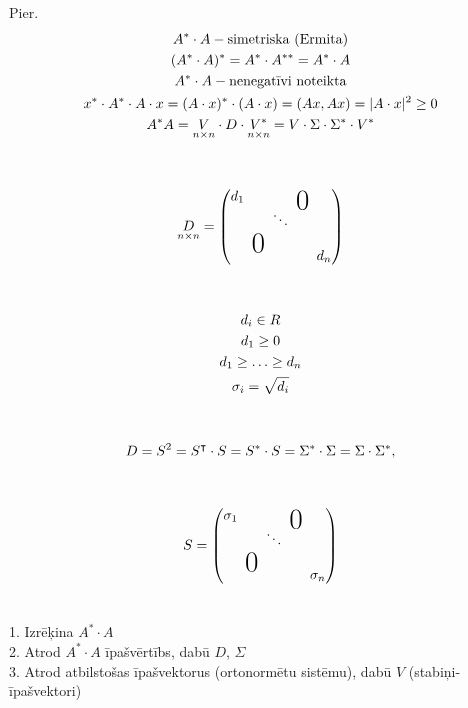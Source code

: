 \documentclass[12pt]{article}
\begin{document}
Pier. 
\begin{gather*}
A^{*} \cdot A  - \text{simetriska (Ermita)} \\
(A^{*} \cdot A)^{*} = A^{*} \cdot A^{**} = A^{*} \cdot A \\
 A^{*} \cdot A - \text{nenegatīvi noteikta} \\
x^{*} \cdot A^{*} \cdot A \cdot x = (A \cdot x)^{*} \cdot (A \cdot x) = (Ax, Ax) = |A \cdot x|^{2} \geq 0 \\
A^* A = \underset{n \times n}{V} \cdot D \cdot \underset{n \times n}{V^*} = V \cdot \Sigma \cdot \Sigma ^ * \cdot V^* \\ 
\\ \\
\underset{n \times n}{D} = 
  \begin{pmatrix}
   	d_1 & && \bigzero   \\
	& &  \ddots  &\\ 
        & \bigzero  &  \\
    	& &  & &  d_n  \\ 
 \end{pmatrix} \\ 
 \\ \\
 d_i \in R \\
 d_1 \geq 0 \\
 d_1 \geq \ldots \geq d_n \\
 \sigma_i = \sqrt{d_i} \\ 
 \\ \\
 D = S^2 = S^{\intercal} \cdot S = S^{*} \cdot S = \Sigma^* \cdot \Sigma = \Sigma \cdot \Sigma^*, \\
 \\ \\
 S  =
   \begin{pmatrix}
   	\sigma_1 & && \bigzero   \\
	& &  \ddots  &\\ 
        & \bigzero  &  \\
    	& &  & &  \sigma_n  \\ 
 \end{pmatrix} \\ \\
\end{gather*}

\pagebreak


1. Izrēķina $A^* \cdot A$ \\
2. Atrod $A^* \cdot A$ īpašvērtībs, dabū $D$, $\Sigma$ \\
3. Atrod atbilstošas īpašvektorus (ortonormētu sistēmu), dabū $V$ (stabiņi-īpašvektori) \\
 
\end{document}
